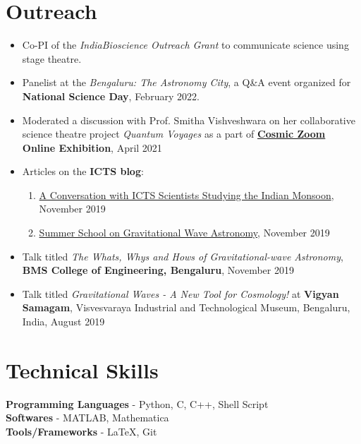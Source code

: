 		\section{Outreach}
		\begin{itemize}[leftmargin=*]
			\item Co-PI of the \textit{IndiaBioscience Outreach Grant} to communicate science using stage theatre.
			\item Panelist at the \textit{Bengaluru: The Astronomy City}, a Q\&A event organized for \textbf{National Science Day}, February 2022.
			\item Moderated a discussion with Prof. Smitha Vishveshwara on her collaborative science theatre project \textit{Quantum Voyages} as a part of \textbf{\href{https://cosmic-zoom.in/}{Cosmic Zoom} Online Exhibition}, April 2021
			\item Articles on the \textbf{ICTS blog}:
			\begin{enumerate}
				\item \href{https://blog.icts.res.in/blog/conversation-icts-scientists-studying-indian-monsoon}{A Conversation with ICTS Scientists Studying the Indian Monsoon}, November 2019
				\item \href{https://blog.icts.res.in/blog/summer-school-gravitational-wave-astronomy}{Summer School on Gravitational Wave Astronomy}, November 2019
			\end{enumerate}	
			\item Talk titled \textit{The Whats, Whys and Hows of Gravitational-wave Astronomy}, \textbf{BMS College of Engineering, Bengaluru}, November 2019
			\item Talk titled \textit{Gravitational Waves - A New Tool for Cosmology!} at \textbf{Vigyan Samagam}, Visvesvaraya Industrial and Technological Museum, Bengaluru, India, August 2019
			
		\end{itemize}
		
		
		
		
		\section{Technical \hspace{2mm} Skills}
		\textbf{Programming Languages} - Python, C, C++, Shell Script\\
		\textbf{Softwares} - MATLAB, Mathematica \\
		\textbf{Tools/Frameworks} - \LaTeX, Git
		
